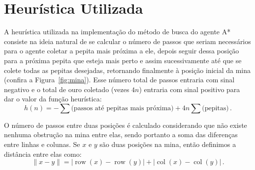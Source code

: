 \documentclass[12pt,a4paper]{article}
\DeclareMathOperator{\col}{col}
\DeclareMathOperator{\row}{row}
\begin{document}
\section{Heurística Utilizada}
\label{sec:h}

A heurística utilizada na implementação do método de busca do agente A* consiste na ideia natural de 
se calcular o número de passos que seriam necessários para o agente coletar a pepita mais próxima a 
ele, depois seguir dessa posição para a próxima pepita que esteja mais perto e assim sucessivamente 
até que se colete todas as pepitas desejadas, retornando finalmente à posição inicial da mina 
(confira a Figura~\ref{fig:mina}). Esse número total de passos entraria com sinal negativo e o total 
de ouro coletado (vezes $4n$) entraria com sinal positivo para dar o valor da função heurística: 
%
\begin{equation*}
h(n) = - \sum \text{(passos até pepitas mais próxima)} 
+ 4 n \sum \text{(pepitas)} \, .
\end{equation*}

O número de passos entre duas posições é calculado considerando que não existe nenhuma obstrução na 
mina entre elas, sendo portanto a soma das diferenças entre linhas e colunas. Se $x$ e $y$ são duas
posições na mina, então definimos a distância entre elas como:
%
\begin{equation*}
\|x - y\| = |\row(x)-\row(y)| + |\col(x) - \col(y)| \, .
\end{equation*}
\end{document}
